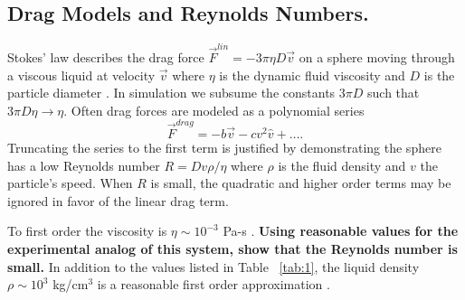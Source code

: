 \documentclass[twocolumn,preprintnumbers,amsmath,amssymb,aps,prx]{revtex4}
\begin{document}
\subsection{Drag Models and Reynolds Numbers.}
Stokes' law describes the drag force
$\vec{F}^{lin} = -3 \pi \eta D \vec{v}$ 
on a sphere
moving through a viscous liquid at velocity $\vec{v}$ 
  where $\eta$ is the dynamic fluid viscosity and 
  $D$ is the particle diameter \cite{Taylor2005}.
  In simulation we
  subsume the constants $3 \pi D$
  such that $3 \pi D \eta \rightarrow \eta $.
  Often drag forces are
  modeled as a polynomial series ~\cite{Taylor2005}
  \begin{equation}
    \vec{F}^{drag} = -b \vec{v} - c v^2 \hat{v} + \ldots  .
  \end{equation}
  Truncating the series to the first term
  is justified by demonstrating the sphere
  has a low Reynolds number  
  $R = D v \rho / \eta$
  where $\rho$ is the fluid density and $v$ the particle's speed.
  When $R$ is small, the quadratic and higher order terms
  may be ignored in favor of the linear drag term.

  To first order the viscosity is $\eta \sim 10^{-3}$ Pa-s \cite{Volpe2013}.
  {\bf Using reasonable values for the
  experimental analog of this system, 
  show that the Reynolds number is small.}
  In addition to the values listed in Table ~\ref{tab:1}, 
  the liquid density %
  $\rho \sim 10^3$ kg/cm$^3$ is a reasonable
  first order approximation
  \cite{asce}.
  

\end{document}
